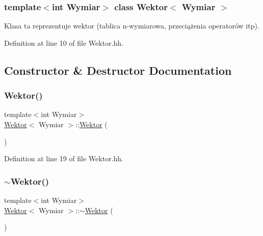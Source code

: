 \subsubsection*{template$<$int Wymiar$>$\newline
class Wektor$<$ Wymiar $>$}

Klasa ta reprezentuje wektor (tablica n-\/wymiarowa, przeciążenia operatorów itp). 

Definition at line 10 of file Wektor.\+hh.



\subsection{Constructor \& Destructor Documentation}
\mbox{\label{class_wektor_acfa7e8deeb9dacb94d3c3d13b1f23d8f}} 
\subsubsection{\texorpdfstring{Wektor()}{Wektor()}\hspace{0.1cm}{\footnotesize\ttfamily [1/2]}}
{\footnotesize\ttfamily template$<$int Wymiar$>$ \\
\hyperlink{class_wektor}{Wektor}$<$ Wymiar $>$\+::\hyperlink{class_wektor}{Wektor} (\begin{DoxyParamCaption}{ }\end{DoxyParamCaption})\hspace{0.3cm}{\ttfamily [inline]}}



Definition at line 19 of file Wektor.\+hh.

\mbox{\label{class_wektor_a08017a99d115b17957e728d5ac2dc432}} 
\subsubsection{\texorpdfstring{$\sim$\+Wektor()}{~Wektor()}}
{\footnotesize\ttfamily template$<$int Wymiar$>$ \\
\hyperlink{class_wektor}{Wektor}$<$ Wymiar $>$\+::$\sim$\hyperlink{class_wektor}{Wektor} (\begin{DoxyParamCaption}{ }\end{DoxyParamCaption})\hspace{0.3cm}{\ttfamily [inline]}}



